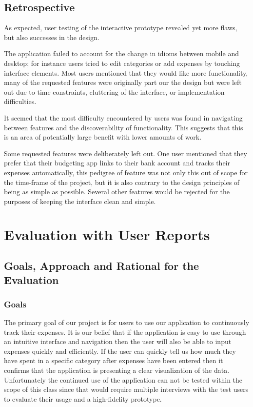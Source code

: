 \documentclass{chi2011}
\begin{document}
    \subsection{Retrospective}

    As expected, user testing of the interactive prototype revealed yet more
    flaws, but also successes in the design.

    The application failed to account for the change in idioms between mobile
    and desktop; for instance users tried to edit categories or add expenses
    by touching interface elements. Most users mentioned that they would like
    more functionality, many of the requested features were originally part our
    the design but were left out due to time constraints, cluttering of the
    interface, or implementation difficulties.

    It seemed that the most difficulty encountered by users was found in
    navigating between features and the discoverability of functionality. This
    suggests that this is an area of potentially large benefit with lower
    amounts of work.

    Some requested features were deliberately left out. One user mentioned that
    they prefer that their budgeting app links to their bank account and tracks
    their expenses automatically, this pedigree of feature was not only this
    out of scope for the time-frame of the project, but it is also contrary
    to the design principles of being as simple as possible. Several other
    features would be rejected for the purposes of keeping the interface clean
    and simple.

\section{Evaluation with User Reports}

	\subsection{Goals, Approach and Rational for the Evaluation}

		\subsubsection{Goals}

		The primary goal of our project is for users to use our application to continuously track their
		expenses. It is our belief that if the application is easy to use through an intuitive
		interface and navigation then the user will also be able to input expenses quickly and efficiently.
		If the user can quickly tell us how much they have spent in a specific category after expenses have
		been entered then it confirms that the application is presenting a clear visualization of the data.
		Unfortunately the continued use of the application can not be tested within the scope of this class
		since that would require multiple interviews with the test users to evaluate their usage and a
		high-fidelity prototype.
\end{document}
